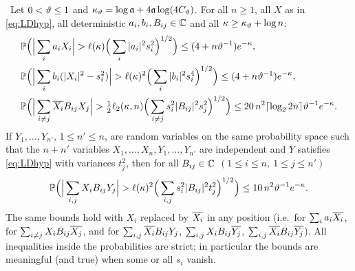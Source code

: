 \begin{lemma}\label{lem:LD} \infra\
Let $0<\vartheta\le1$ and $\kappa_\vartheta=\log\mathfrak{a}+4\mathfrak{a}\log(4C_\vartheta)$. For all $n\ge1$, all $X$ as in \eqref{eq:LDhyp}, all deterministic $a_i,b_i,B_{ij}\in\mathbb{C}$ and all $\kappa\ge\kappa_\vartheta+\log n$:
\begin{align}
 &\PP\Big(\Big|\sum_ia_iX_i\Big|>\ell(\kappa)\Big(\sum_i|a_i|^2s_i^2\Big)^{1/2}\Big)\le(4+n\vth^{-1})e^{-\kappa},\label{eq:LD1}\\
 &\PP\Big(\Big|\sum_ib_i(|X_i|^2-s_i^2)\Big|>\ell(\kappa)^2\Big(\sum_i|b_i|^2s_i^4\Big)^{1/2}\Big)\le(4+n\vth^{-1})e^{-\kappa},\label{eq:LD2}\\
 &\PP\Big(\Big|\sum_{i\ne j}\ol{X_i}B_{ij}X_j\Big|>\tfrac12\ell_2(\kappa,n)\Big(\sum_{i\ne j}s_i^2|B_{ij}|^2s_j^2\Big)^{1/2}\Big)\le20\,n^2\lceil\log_2 2n\rceil\vth^{-1}e^{-\kappa}.\label{eq:LD3}
\end{align}
If $Y_1,\dots,Y_{n'}$, $1\le n'\le n$, are random variables on the same probability space such that the $n+n'$ variables $X_1,\dots,X_n,Y_1,\dots,Y_{n'}$ are independent and
$Y$ satisfies \eqref{eq:LDhyp} with variances $t_j^2$, then for all $B_{ij}\in\mathbb{C}$ $(1\le i\le n,\ 1\le j\le n')$
\begin{equation}\label{eq:LD4}
 \PP\Big(\Big|\sum_{i,j}X_iB_{ij}Y_j\Big|>\ell(\kappa)^2\Big(\sum_{i,j}s_i^2|B_{ij}|^2t_j^2\Big)^{1/2}\Big)\le10\,n^2\vth^{-1}e^{-\kappa}.
\end{equation}
The same bounds hold with $X_i$ replaced by $\overline{X_i}$ in any position (i.e.\ for $\sum_ia_i\overline{X_i}$, for $\sum_{i\ne j}X_iB_{ij}\overline{X_j}$, and for $\sum_{i,j}\overline{X_i}B_{ij}Y_j$, $\sum_{i,j}X_iB_{ij}\overline{Y_j}$, $\sum_{i,j}\overline{X_i}B_{ij}\overline{Y_j}$).
All inequalities inside the probabilities are strict; in particular the bounds are meaningful (and true) when some or all $s_i$ vanish.
\end{lemma}
